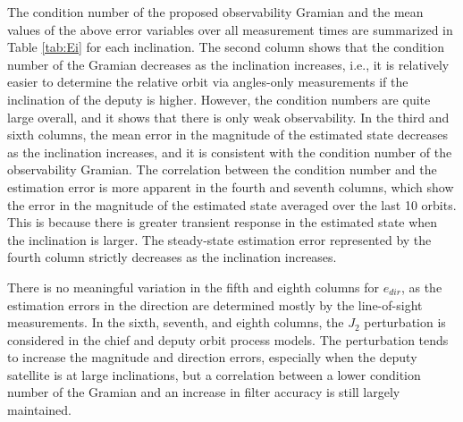 The condition number of the proposed observability Gramian and the mean values of the above error variables over all measurement times are summarized in Table \ref{tab:Ei} for each inclination. The second column shows that the condition number of the Gramian decreases as the inclination increases, i.e., it is relatively easier to determine the relative orbit via angles-only measurements if the inclination of the deputy is higher. However, the condition numbers are quite large overall, and it shows that there is only weak observability. In the third and sixth columns, the mean error in the magnitude of the estimated state decreases as the inclination increases, and it is consistent with the condition number of the observability Gramian. The correlation between the condition number and the estimation error is more apparent in the fourth and seventh columns, which show the error in the magnitude of the estimated state averaged over the last 10 orbits. This is because there is greater transient response in the estimated state when the inclination is larger. The steady-state estimation error represented by the fourth column strictly decreases as the inclination increases. 

There is no meaningful variation in the fifth and eighth columns for $e_{dir}$, as the estimation errors in the direction are determined mostly by the line-of-sight measurements. In the sixth, seventh, and eighth columns, the $J_2$ perturbation is considered in the chief and deputy orbit process models. The perturbation tends to increase the magnitude and direction errors, especially when the deputy satellite is at large inclinations, but a correlation between a lower condition number of the Gramian and an increase in filter accuracy is still largely maintained.


